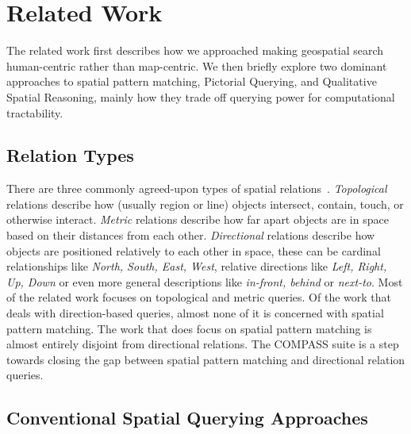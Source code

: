 \section{Related Work}
\label{section:related}

The related work first describes how we approached making geospatial search human-centric rather than map-centric. 
We then briefly explore two dominant approaches to spatial pattern matching, Pictorial Querying, and Qualitative Spatial Reasoning, mainly how they trade off querying power for computational tractability. 

\subsection*{Relation Types}

\par{
    There are three commonly agreed-upon types of spatial relations~\cite{Carniel2020,Bertella2022,Carniel2023}. 
    \textit{Topological} relations describe how (usually region or line) objects intersect, contain, touch, or otherwise interact.
    \textit{Metric} relations describe how far apart objects are in space based on their distances from each other. 
    \textit{Directional} relations describe how objects are positioned relatively to each other in space, these can be cardinal relationships like \textit{North, South, East, West}, relative directions like \textit{Left, Right, Up, Down} or even more general descriptions like \textit{in-front, behind} or \textit{next-to}.
    Most of the related work focuses on topological and metric queries.
    Of the work that deals with direction-based queries, almost none of it is concerned with spatial pattern matching. 
    The work that does focus on spatial pattern matching is almost entirely disjoint from directional relations. 
    The COMPASS suite is a step towards closing the gap between spatial pattern matching and directional relation queries.
}

\subsection{Conventional Spatial Querying Approaches}

